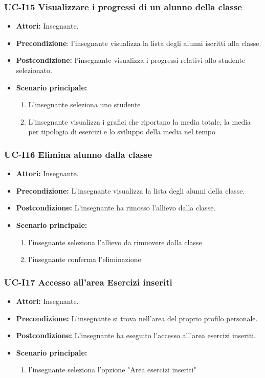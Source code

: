 \subsubsection{UC-I15 Visualizzare i progressi di un alunno della classe}
\begin{itemize}
	\item \textbf{Attori:} Insegnante.
	\item \textbf{Precondizione}: l'insegnante visualizza la lista degli alunni iscritti alla classe.
	\item \textbf{Postcondizione:} l'insegnante visualizza i progressi relativi allo studente selezionato.
	\item \textbf{Scenario principale:}
	\begin{enumerate}
		\item L'insegnante seleziona uno studente
		\item L'insegnante visualizza i grafici che riportano la media totale, la media per tipologia di esercizi e lo sviluppo della media nel tempo
	\end{enumerate}
\end{itemize}

\subsubsection{UC-I16 Elimina alunno dalla classe}		
\begin{itemize}
	\item \textbf{Attori:} Insegnante.
	\item \textbf{Precondizione:} L'insegnante visualizza la lista degli alunni della classe.
	\item \textbf{Postcondizione:} L'insegnante ha rimosso l'allievo dalla classe.
	\item \textbf{Scenario principale:}
	\begin{enumerate}
		\item l'insegnante seleziona l'allievo da rimuovere dalla classe
		\item l'insegnante conferma l'eliminazione
	\end{enumerate}	
\end{itemize}

\subsubsection{UC-I17 Accesso all'area Esercizi inseriti}		
\begin{itemize}
	\item \textbf{Attori:} Insegnante.
	\item \textbf{Precondizione:} L'insegnante si trova nell'area del proprio profilo personale.
	\item \textbf{Postcondizione:} L'insegnante ha eseguito l'accesso all'area esercizi inseriti.
	\item \textbf{Scenario principale:}
	\begin{enumerate}
		\item l'insegnante seleziona l'opzione "Area esercizi inseriti"
	\end{enumerate}	
\end{itemize}

